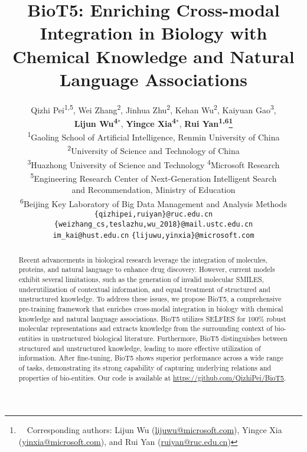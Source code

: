 \documentclass[11pt]{article}
\title{BioT5: Enriching Cross-modal Integration in Biology with Chemical Knowledge and Natural Language Associations}
\author{
    Qizhi Pei\textsuperscript{1,5}, 
    Wei Zhang\textsuperscript{2}, 
    Jinhua Zhu\textsuperscript{2}, 
    Kehan Wu\textsuperscript{2},
    Kaiyuan Gao\textsuperscript{3}, \\
    {\bf Lijun Wu\textsuperscript{4}$^{\ast}$},
    {\bf Yingce Xia\textsuperscript{4}$^{\ast}$},
    {\bf Rui Yan\textsuperscript{1,6}\thanks{\ \ Corresponding authors: Lijun Wu (\url{lijuwu@microsoft.com}), Yingce Xia (\url{yinxia@microsoft.com}), and Rui Yan (\url{ruiyan@ruc.edu.cn})}} \\
    \textsuperscript{1}Gaoling School of Artificial Intelligence, Renmin University of China \\
    \textsuperscript{2}University of Science and Technology of China \\
    \textsuperscript{3}Huazhong University of Science and Technology \quad
    \textsuperscript{4}Microsoft Research\\
    \textsuperscript{5}Engineering Research Center of Next-Generation Intelligent Search\\ and Recommendation, Ministry of Education \\
    \textsuperscript{6}Beijing Key Laboratory of Big Data Management and Analysis Methods \\
    \texttt{\{qizhipei,ruiyan\}@ruc.edu.cn} \\
    \texttt{\{weizhang\_cs,teslazhu,wu\_2018\}@mail.ustc.edu.cn} \\
    \texttt{im\_kai@hust.edu.cn} \quad
    \texttt{\{lijuwu,yinxia\}@microsoft.com} 
}
\begin{document}
\maketitle
\begin{abstract}
Recent advancements in biological research leverage the integration of molecules, proteins, and natural language to enhance drug discovery. However, current models exhibit several limitations, such as the generation of invalid molecular SMILES, underutilization of contextual information, and equal treatment of structured and unstructured knowledge. To address these issues, we propose BioT5, a comprehensive pre-training framework that enriches cross-modal integration in biology with chemical knowledge and natural language associations. BioT5 utilizes SELFIES for 100\% robust molecular representations and extracts knowledge from the surrounding context of bio-entities in unstructured biological literature. Furthermore, BioT5 distinguishes between structured and unstructured knowledge, leading to more effective utilization of information. After fine-tuning, BioT5 shows superior performance across a wide range of tasks, demonstrating its strong capability of capturing underlying relations and properties of bio-entities. Our code is available at \url{https://github.com/QizhiPei/BioT5}.
\end{abstract}
\end{document}
